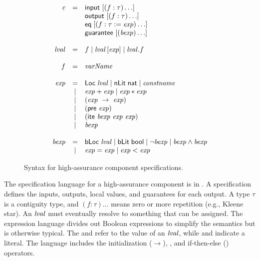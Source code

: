 \begin{figure}
  \[
    \begin{array}{rcl}
      \mathit{c}    & = & \konst{input}\ [(f : \tau)\ldots] \\
                    &   & \konst{output}\ [(f : \tau)\ldots] \\
                    &   & \konst{eq}\; [(f : \tau := \mathit{exp})\ldots] \\
                    &   & \konst{guarantee}\ [(\mathit{bexp})\ldots]\\\\
      
      \lval         & = & f \mid \lval \, [ \mathit{exp} ]
                          \mid \lval . f \\ \\

      f             & = & \mathit{varName} \\ \\

      \mathit{exp}  & = & \konst{Loc}\; \lval
                          \mid \konst{nLit}\; \konst{nat}
                          \mid \mathit{constname} \\
                    & | & \mathit{exp} + \mathit{exp}
                          \mid \mathit{exp} * \mathit{exp} \\
                    & | & (\mathit{exp}\ \rightarrow\ \mathit{exp}) \\
                    & | & (\konst{pre}\ \mathit{exp}) \\
                    & | & (\konst{ite}\ \mathit{bexp}\ \mathit{exp}\ \mathit{exp})\\
                    & | & \mathit{bexp} \\ \\
                          
      \mathit{bexp} & = & \konst{bLoc}\; \lval
                          \mid  \konst{bLit}\; \konst{bool}
                          \mid  \neg \mathit{bexp}
                          \mid  \mathit{bexp} \land \mathit{bexp} \\
                    & | & \mathit{exp} = \mathit{exp} 
                    \mid  \mathit{exp} < \mathit{exp}
\end{array}
\]
\caption{Syntax for high-assurance component specifications.}
\label{fig:syntax}
\end{figure}

The specification language for a high-assurance component is in . A specification defines the inputs, outputs, local values, and guarantees for each output. A type $\tau$ is a contiguity type, and $(f : \tau)\ldots$ means zero or more repetition (e.g., Kleene star). An $\mathit{lval}$ must eventually resolve to something that can be assigned. The expression language divides out Boolean expressions to simplify the semantics but is otherwise typical. The  and  refer to the value of an $\mathit{lval}$, while  and  indicate a literal. The language includes the initialization ($\rightarrow$), , and if-then-else () operators.

